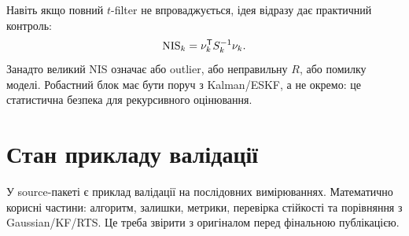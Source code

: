 Навіть якщо повний $t$-filter не впроваджується, ідея відразу дає практичний контроль:
\begin{equation}
  \mathrm{NIS}_k = \nu_k^{\mathsf{T}} S_k^{-1}\nu_k.
\end{equation}
Занадто великий NIS означає або outlier, або неправильну $R$, або помилку моделі. Робастний блок має бути поруч з Kalman/ESKF, а не окремо: це статистична безпека для рекурсивного оцінювання.

\section{Стан прикладу валідації}

У source-пакеті є приклад валідації на послідовних вимірюваннях. Математично корисні частини: алгоритм, залишки, метрики, перевірка стійкості та порівняння з Gaussian/KF/RTS. Це треба звірити з оригіналом перед фінальною публікацією.
